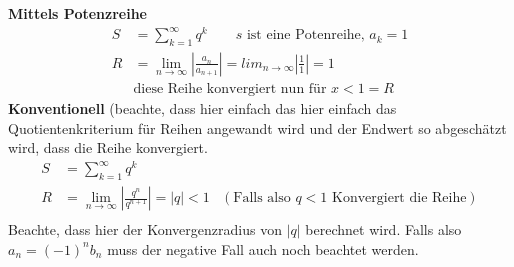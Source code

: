 \documentclass[a4paper]{article}
\begin{document}
			\begin{fmerke}[Konvergenzradius]
				\textbf{Mittels Potenzreihe}
				\begin{align*}
					S &= \sum_{k=1}^\infty q^k 	\qquad \text{$s$ ist eine Potenreihe, $a_k = 1$}\\
					R &= \lim_{n \rightarrow \infty} \left| \frac{a_n}{a_{n+1}} \right| = lim_{n \rightarrow \infty} \left| \frac{1}{1} \right| = 1\\
					&\text{diese Reihe konvergiert nun für $x < 1 = R$}
				\end{align*}
				\textbf{Konventionell} (beachte, dass hier einfach das hier einfach das Quotientenkriterium für Reihen angewandt wird und der Endwert so abgeschätzt wird, dass die Reihe konvergiert.
				\begin{align*}
					S &= \sum_{k=1}^\infty q^k\\
					R &= \lim_{n \rightarrow \infty} \left| \frac{q^{n}}{q^{n+1}} \right| = |q| < 1  &(\text{Falls also $q <1$ Konvergiert die Reihe})\\
				\end{align*}
				Beachte, dass hier der Konvergenzradius von $|q|$ berechnet wird. Falls also $a_n = (-1)^n b_n$ muss der negative Fall auch noch beachtet werden.
			\end{fmerke}
\end{document}
